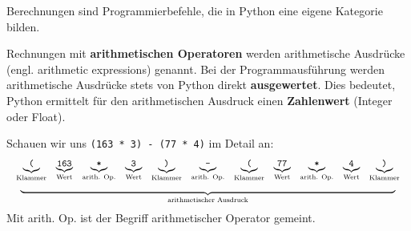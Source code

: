 Berechnungen sind Programmierbefehle, die in Python eine eigene Kategorie bilden.

\begin{definition}
	Rechnungen mit \textbf{arithmetischen Operatoren} werden arithmetische Ausdrücke (engl. arithmetic expressions) genannt. Bei der Programmausführung werden arithmetische Ausdrücke stets von Python direkt \textbf{ausgewertet}. Dies bedeutet, Python ermittelt für den arithmetischen Ausdruck einen \textbf{Zahlenwert} (Integer oder Float).
\end{definition}

\begin{example}
Schauen wir uns \lstinline[language={python3}]{(163 * 3) - (77 * 4)} im Detail an:
$$
\begin{array}[t]{c}
\begin{array}[t]{cccccccccccc} 
\underbrace{\textrm{\texttt{(}}}_{\textrm{Klammer}} & \underbrace{\textrm{\texttt{163}}}_{\textrm{Wert}} & \underbrace{\textrm{\texttt{*}}}_{\textrm{arith. Op.}} & \underbrace{\textrm{\texttt{3}}}_{\textrm{Wert}} & \underbrace{\textrm{\texttt{)}}}_{\textrm{Klammer}} & \underbrace{\textrm{\texttt{-}}}_{\textrm{arith. Op.}} & \underbrace{\textrm{\texttt{(}}}_{\textrm{Klammer}} & \underbrace{\textrm{\texttt{77}}}_{\textrm{Wert}} & \underbrace{\textrm{\texttt{*}}}_{\textrm{arith. Op.}} & \underbrace{\textrm{\texttt{4}}}_{\textrm{Wert}} & \underbrace{\textrm{\texttt{)}}}_{\textrm{Klammer}}
\end{array} \\
\underbrace{\hspace{14cm}}_{\textrm{arithmetischer Ausdruck}}
\end{array}
$$
Mit arith. Op. ist der Begriff arithmetischer Operator gemeint.

\end{example}